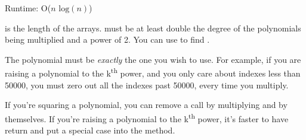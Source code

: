
Runtime: O($n\text{ log}(n)$)

 is the length of the arrays.  must be at least double the degree of the polynomials being multiplied and a power of 2. You can use  to find .

The polynomial must be \textit{exactly} the one you wish to use. For example, if you are raising a polynomial to the k\textsuperscript{th} power, and you only care about indexes less than 50000, you must zero out all the indexes past 50000, every time you multiply.

If you're squaring a polynomial, you can remove a  call by multiplying  and  by themselves. If you're raising a polynomial to the k\textsuperscript{th} power, it's faster to have  return  and put a special case into the  method. 



\newpage